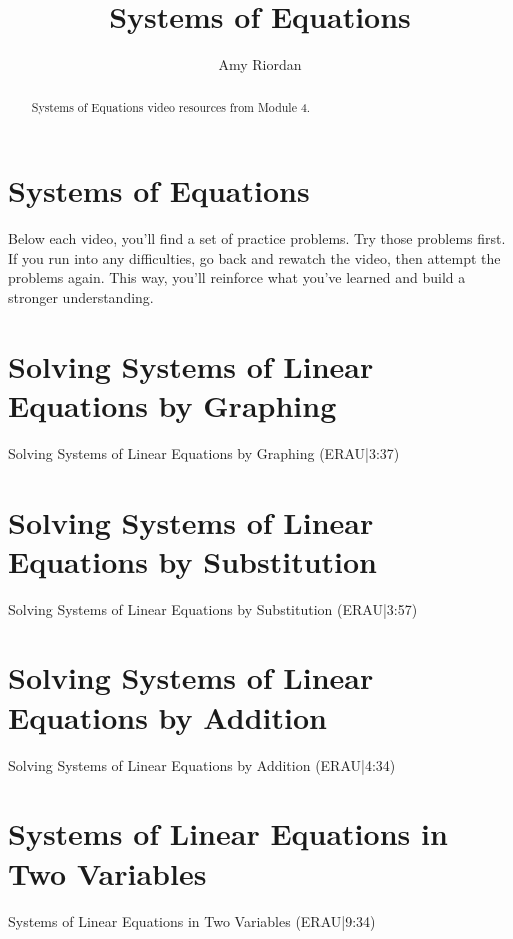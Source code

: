 \documentclass{ximera}
\title{Systems of Equations}
\author{Amy Riordan}
\begin{document}
\begin{abstract}
Systems of Equations video resources from Module 4.
\end{abstract}
\maketitle

\section*{Systems of Equations}

Below each video, you’ll find a set of practice problems. Try those problems first. If you run into any difficulties, go back and rewatch the video, then attempt the problems again. This way, you’ll reinforce what you’ve learned and build a stronger understanding.

\section*{Solving Systems of Linear Equations by Graphing}

Solving Systems of Linear Equations by Graphing (ERAU|3:37)




\section*{Solving Systems of Linear Equations by Substitution}

Solving Systems of Linear Equations by Substitution (ERAU|3:57)




\section*{Solving Systems of Linear Equations by Addition}

Solving Systems of Linear Equations by Addition (ERAU|4:34)




\section*{Systems of Linear Equations in Two Variables}

Systems of Linear Equations in Two Variables (ERAU|9:34)

\end{document}
